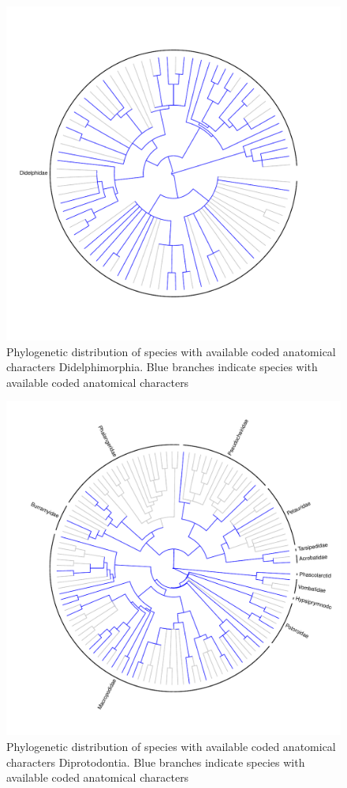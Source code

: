 \documentclass[12pt,letterpaper]{article}
\begin{document}
\begin{figure}[!htbp]
\centering
    \includegraphics[width=1\textwidth]{Supp_figure_DIDELPHIMORPHIA.pdf}
\caption{Phylogenetic distribution of species with available coded anatomical characters Didelphimorphia. Blue branches indicate species with available coded anatomical characters}
\label{Supp_Figure_Phylo-Didelphimorphia}
\end{figure}

\begin{figure}[!htbp]
\centering
    \includegraphics[width=1\textwidth]{Supp_figure_DIPROTODONTIA.pdf}
\caption{Phylogenetic distribution of species with available coded anatomical characters Diprotodontia. Blue branches indicate species with available coded anatomical characters}
\label{Supp_Figure_Phylo-Diprotodontia}
\end{figure}
\end{document}
